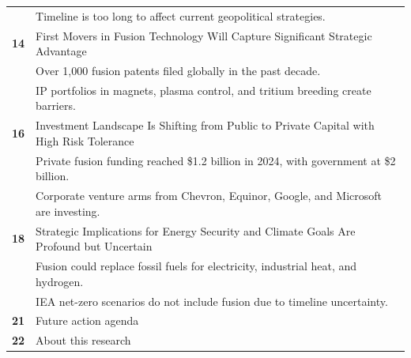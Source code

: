 \documentclass[10pt,a4paper]{article}
\begin{document}
\begin{tabularx}{\linewidth}{p{14mm}Y}
 & {\scriptsize\color{BOMuted} Timeline is too long to affect current geopolitical strategies.} \\[1pt]
\textcolor{BOGreen}{\bfseries 14} & First Movers in Fusion Technology Will Capture Significant Strategic Advantage \\[5pt]
 & {\scriptsize\color{BOMuted} Over 1,000 fusion patents filed globally in the past decade.} \\[1pt]
 & {\scriptsize\color{BOMuted} IP portfolios in magnets, plasma control, and tritium breeding create barriers.} \\[1pt]
\textcolor{BOGreen}{\bfseries 16} & Investment Landscape Is Shifting from Public to Private Capital with High Risk Tolerance \\[5pt]
 & {\scriptsize\color{BOMuted} Private fusion funding reached \$1.2 billion in 2024, with government at \$2 billion.} \\[1pt]
 & {\scriptsize\color{BOMuted} Corporate venture arms from Chevron, Equinor, Google, and Microsoft are investing.} \\[1pt]
\textcolor{BOGreen}{\bfseries 18} & Strategic Implications for Energy Security and Climate Goals Are Profound but Uncertain \\[5pt]
 & {\scriptsize\color{BOMuted} Fusion could replace fossil fuels for electricity, industrial heat, and hydrogen.} \\[1pt]
 & {\scriptsize\color{BOMuted} IEA net-zero scenarios do not include fusion due to timeline uncertainty.} \\[1pt]
\textcolor{BOGreen}{\bfseries 21} & Future action agenda \\[5pt]
\textcolor{BOGreen}{\bfseries 22} & About this research \\[5pt]
\end{tabularx}
\clearpage
\end{document}

